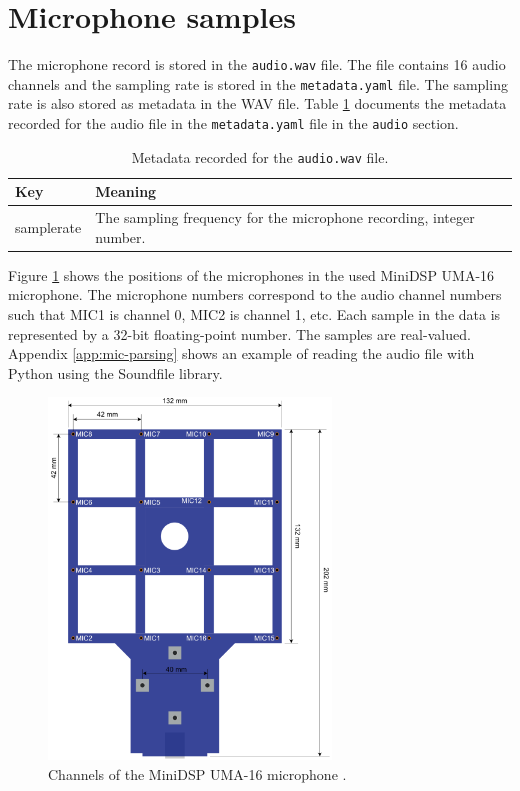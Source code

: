 \section{Microphone samples}
\label{sec:audio-file}
The microphone record is stored in the \texttt{audio.wav} file. 
The file contains 16 audio channels and the sampling rate is stored in the \texttt{metadata.yaml} file.
The sampling rate is also stored as metadata in the WAV file.
Table \ref{tab:mic-metadata} documents the metadata recorded for the audio file in the \texttt{metadata.yaml} file in the \texttt{audio} section.

\begin{table}[H]
    \centering
    \begin{tabular}{l l}
        \toprule
        \textbf{Key} & \textbf{Meaning} \\
        \midrule
        samplerate & The sampling frequency for the microphone recording, integer number. \\
        \bottomrule
    \end{tabular}
    \caption{Metadata recorded for the \texttt{audio.wav} file.}
    \label{tab:mic-metadata}
\end{table}

Figure \ref{fig:mic-channels} shows the positions of the microphones in the used MiniDSP UMA-16 microphone.
The microphone numbers correspond to the audio channel numbers such that MIC1 is channel 0, MIC2 is channel 1, etc.
Each sample in the data is represented by a 32-bit floating-point number.
The samples are real-valued.
Appendix \ref{app:mic-parsing} shows an example of reading the audio file with Python using the Soundfile \cite{python-soundfile} library.

\begin{figure}
    \centering
    \includegraphics[width=0.67\textwidth]{fig/4/microphone-channels.png}
    \caption{Channels of the MiniDSP UMA-16 microphone \cite{minidsp-spec}.}
    \label{fig:mic-channels}
\end{figure}

